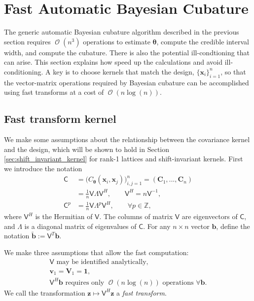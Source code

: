 \documentclass[twocolumn]{svjour3}          %
\DeclareMathOperator{\Order}{{\mathcal O}}
\newcommand{\bm}[1]{\boldsymbol{#1}}
\newcommand{\integers}{\mathbb{Z}}
\newcommand{\vtheta}{{\bm{\theta}}}
\newcommand{\vb}{\bm{b}}
\newcommand{\vC}{\bm{C}}
\newcommand{\vv}{\bm{v}}
\newcommand{\vV}{\bm{V}}
\newcommand{\vx}{\bm{x}}
\newcommand{\vz}{\bm{z}}
\newcommand{\vone}{\bm{1}}
\newcommand{\mC}{\mathsf{C}}
\newcommand{\mLambda}{\mathsf{\Lambda}}
\newcommand{\mV}{\mathsf{V}}
\begin{document}
\section{Fast Automatic Bayesian Cubature}\label{sec:fast_BC}

The generic automatic Bayesian cubature algorithm described in the previous section requires $\Order(n^3)$ operations to estimate $\vtheta$, compute the credible interval width, and compute the cubature.  There is also the potential ill-condtioning that can arise.  This section explains how speed up the calculations and avoid ill-conditioning.  A key is to choose kernels that match the design, $\{\vx_i\}_{i=1}^n$, so that the vector-matrix operations required by Bayesian cubature can be accomplished using fast transforms at a cost of $\Order(n \log(n))$.

\subsection{Fast transform kernel}
We make some assumptions about the relationship between the covariance kernel and the design, which will be shown to hold in Section \ref{sec:shift_invariant_kernel} for rank-1 lattices and shift-invariant kernels.  First we introduce the notation
\begin{align}
\nonumber
\mC &= \Big(C_\vtheta(\vx_i,\vx_j)\Big)_{i,j=1}^n  = (\vC_1,...,\vC_n) 
\\
\label{eqn:ftk_factor}
&= \frac 1n \mV \mLambda \mV^H , 
\quad \quad \mV^H = n \mV^{-1}, \\
\nonumber
\mC^p  &= \frac 1n \mV \mLambda^{p} \mV^H, \qquad \forall p \in \integers,
\end{align}
where $\mV^H$ is the Hermitian of $\mV$.  The columns of matrix $\mV$ are eigenvectors of $\mC$, and $\mLambda$ is a diagonal matrix of eigenvalues of $\mC$.
For any $n \times n$ vector $\vb$, define the notation  $\widetilde{\vb} := \mV^T \vb$.

We make three assumptions that allow the fast computation:
\begin{subequations} \label{fastcompAssump}
	\begin{gather}
	\label{fastcompAssumpA}
	\mV \text{ may be identified analytically}, \\
	\label{fastcompAssumpB}
	\vv_1 = \vV_1 = \vone, \\
	\label{fastcompAssumpC}
	\mV^H \vb  \text{ requires only $\Order(n \log(n))$ operations } \forall \vb.
	\end{gather}
\end{subequations}
We call the transformation $\vz \mapsto \mV^H \vz$ a \emph{fast transform}.  
\end{document}
